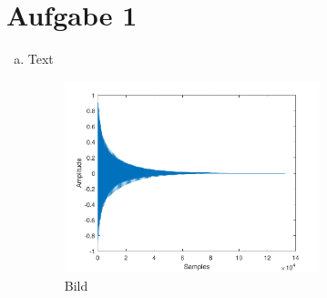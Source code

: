 \chapter{Aufgabe 1}

\begin{enumerate}[a)]
\item
Text


\begin{figure}[H]
    \center
    \includegraphics[width = 0.7\textwidth]{figures/samples.pdf}
    \caption{Bild}
    \label{fig:bs1}
\end{figure}

\end{enumerate}